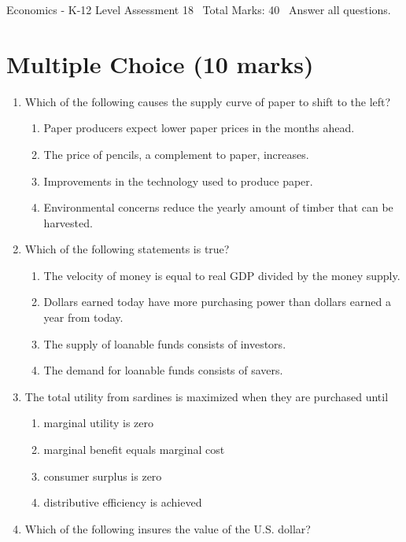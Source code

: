 \documentclass[12pt]{article}
\begin{document}
\begin{center}
Economics - K-12 Level Assessment 18 \
Total Marks: 40 \
Answer all questions.
\end{center}

\section*{Multiple Choice (10 marks)}
\begin{enumerate}[label=\arabic*.]
\item Which of the following causes the supply curve of paper to shift to the left?
\begin{enumerate}[label=(\alph*)]
    \item Paper producers expect lower paper prices in the months ahead.
    \item The price of pencils, a complement to paper, increases.
    \item Improvements in the technology used to produce paper.
    \item Environmental concerns reduce the yearly amount of timber that can be harvested.
\end{enumerate}
\item Which of the following statements is true?
\begin{enumerate}[label=(\alph*)]
    \item The velocity of money is equal to real GDP divided by the money supply.
    \item Dollars earned today have more purchasing power than dollars earned a year from today.
    \item The supply of loanable funds consists of investors.
    \item The demand for loanable funds consists of savers.
\end{enumerate}
\item The total utility from sardines is maximized when they are purchased until
\begin{enumerate}[label=(\alph*)]
    \item marginal utility is zero
    \item marginal benefit equals marginal cost
    \item consumer surplus is zero
    \item distributive efficiency is achieved
\end{enumerate}
\item Which of the following insures the value of the U.S. dollar?
\begin{enumerate}[label=(\alph*)]

\end{enumerate}
\end{enumerate}
\end{document}

